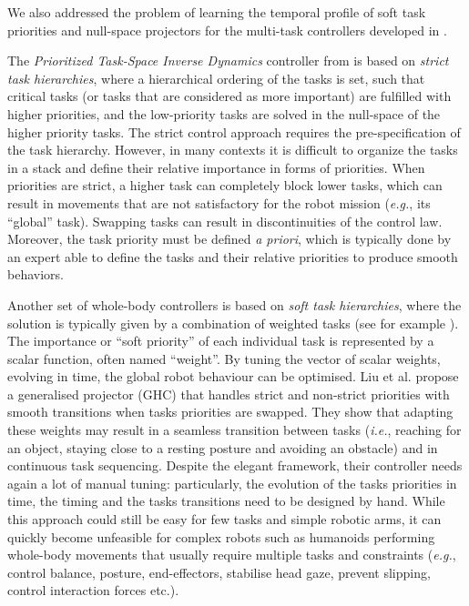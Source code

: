 \documentclass[final,5p,twocolumn]{elsarticle}
\begin{document}
We also addressed the problem of learning the temporal profile of soft
task priorities and null-space projectors for the multi-task controllers
developed in \cite{liuGHC2015}.

The \textit{Prioritized Task-Space Inverse Dynamics} controller from \cite{DelPrete-2014-ID267}
is based on \textit{strict task hierarchies}, where a hierarchical ordering of
the tasks is set, such that critical tasks (or tasks that are considered as more
important) are fulfilled with higher priorities, and the low-priority tasks are
solved in the null-space of the higher priority tasks. The strict control approach requires the
pre-specification of the task hierarchy. However, in many contexts it is
difficult to organize the tasks in a stack and define their relative importance
in forms of priorities. When priorities are strict, a higher task can completely
block lower tasks, which can result in movements that are not satisfactory for
the robot mission (\textit{e.g.}, its ``global'' task). Swapping tasks can result in discontinuities of the control law.
Moreover, the task priority must be defined \textit{a priori}, which
is typically done by an expert able to define the tasks and their relative priorities to produce smooth behaviors.

Another set of whole-body controllers is based on \textit{soft task hierarchies}, where
the solution is typically given by a combination of weighted tasks (see for example \cite{Salini-2011-ID348}). 
The importance or ``soft priority'' of each individual
task is represented by a scalar function, often named ``weight''. By tuning the vector of scalar weights,
evolving in time, the global robot behaviour can be optimised. Liu et
al. \cite{liuGHC2015} propose a generalised projector (GHC) that handles
strict and non-strict priorities with smooth transitions when tasks priorities
are swapped. They show that adapting these weights may result in a seamless
transition between tasks (\textit{i.e.}, reaching for an object, staying close to a
resting posture and avoiding an obstacle) and in continuous task sequencing.
Despite the elegant framework, their controller needs again a lot of manual
tuning: particularly, the evolution of the tasks priorities in time, the timing
and the tasks transitions need to be designed by hand. While this approach could
still be easy for few tasks and simple robotic arms, it can quickly become
unfeasible for complex robots such as humanoids performing whole-body movements
that usually require multiple tasks and constraints (\textit{e.g.}, control balance,
posture, end-effectors, stabilise head gaze, prevent slipping, control
interaction forces etc.).
\end{document}
